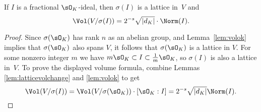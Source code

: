\begin{lemma}\label{lem:volfracideal}
	If $I$ is a fractional $\sO_K$-ideal, then $\sigma(I)$ is
	a lattice in~$V$ and
	$$
	\Vol(V/\sigma(I)) = 2^{-s}\sqrt{|d_K|}\cdot \Norm(I).
	$$
\end{lemma}
\begin{proof}
	Since $\sigma(\sO_K)$ has rank $n$ as an abelian group, and
	Lemma~\ref{lem:volok} implies that $\sigma(\sO_K)$ also spans $V$,
	it follows that $\sigma(\sO_K)$ is a lattice in $V$.
	For some nonzero integer $m$ we have
	$m\sO_K \subset I \subset \frac{1}{m}\sO_K$,
	so $\sigma(I)$ is also a lattice in~$V$.
	To prove the displayed volume
	formula, combine Lemmas
	\ref{lem:latticevolchange} and \ref{lem:volok} to get
	$$
	\Vol(V/\sigma(I))
	= \Vol(V/\sigma(\sO_K))\cdot[\sO_K:I]
	= 2^{-s}\sqrt{|d_K|}\Norm(I).
	$$
\end{proof}


